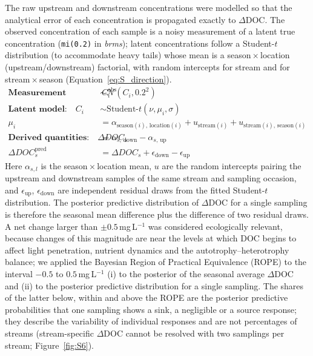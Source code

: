 \documentclass[11pt,a4paper]{article}
\begin{document}
The raw upstream and downstream concentrations were modelled so that the analytical error of each concentration is propagated exactly to $\Delta$DOC. The observed concentration of each sample is a noisy measurement of a latent true concentration (\texttt{mi(0.2)} in \emph{brms}); latent concentrations follow a Student-$t$ distribution (to accommodate heavy tails) whose mean is a season\,$\times$\,location (upstream/downstream) factorial, with random intercepts for stream and for stream\,$\times$\,season (Equation~\ref{eq:S_direction}).
\begin{equation}
\begin{aligned}
\textbf{Measurement model:} \quad
C_i^{\text{obs}} &\sim \mathcal{N}(C_i, 0.2^2) \\[0.5em]
\textbf{Latent model:} \quad
C_i &\sim \text{Student-}t(\nu, \mu_i, \sigma) \\
\mu_i &= \alpha_{\text{season}(i),\,\text{location}(i)} + u_{\text{stream}(i)} + u_{\text{stream}(i),\,\text{season}(i)} \\[0.5em]
\textbf{Derived quantities:} \quad
\Delta DOC_s &= \alpha_{s,\,\text{down}} - \alpha_{s,\,\text{up}} \\
\Delta DOC_s^{\text{pred}} &= \Delta DOC_s + \epsilon_{\text{down}} - \epsilon_{\text{up}}
\end{aligned}
\label{eq:S_direction}
\end{equation}
Here $\alpha_{s,l}$ is the season\,$\times$\,location mean, $u$ are the random intercepts pairing the upstream and downstream samples of the same stream and sampling occasion, and $\epsilon_{\text{up}}$, $\epsilon_{\text{down}}$ are independent residual draws from the fitted Student-$t$ distribution. The posterior predictive distribution of $\Delta$DOC for a single sampling is therefore the seasonal mean difference plus the difference of two residual draws. A net change larger than $\pm0.5$\,mg\,L$^{-1}$ was considered ecologically relevant, because changes of this magnitude are near the levels at which DOC begins to affect light penetration, nutrient dynamics and the autotrophy--heterotrophy balance; we applied the Bayesian Region of Practical Equivalence (ROPE) to the interval $-0.5$ to $0.5$\,mg\,L$^{-1}$ (i) to the posterior of the seasonal average $\Delta$DOC and (ii) to the posterior predictive distribution for a single sampling. The shares of the latter below, within and above the ROPE are the posterior predictive probabilities that one sampling shows a sink, a negligible or a source response; they describe the variability of individual responses and are not percentages of streams (stream-specific $\Delta$DOC cannot be resolved with two samplings per stream; Figure~\ref{fig:S6}).
\end{document}
